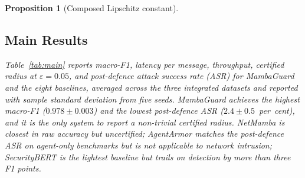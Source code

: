\documentclass{ieeeaccess}
\newtheorem{proposition}[theorem]{Proposition}
\begin{document}
\begin{proposition}[Composed Lipschitz constant]
\subsection{Main Results}
\label{sec:results}
Table~\ref{tab:main} reports macro-F1, latency per message, throughput, certified radius at $\varepsilon=0.05$, and post-defence attack success rate (ASR) for MambaGuard and the eight baselines, averaged across the three integrated datasets and reported with sample standard deviation from five seeds. MambaGuard achieves the highest macro-F1 ($0.978\pm0.003$) and the lowest post-defence ASR ($2.4\pm0.5$~per~cent), and it is the only system to report a non-trivial certified radius. NetMamba is closest in raw accuracy but uncertified; AgentArmor matches the post-defence ASR on agent-only benchmarks but is not applicable to network intrusion; SecurityBERT is the lightest baseline but trails on detection by more than three F1 points.


\end{proposition}
\end{document}
